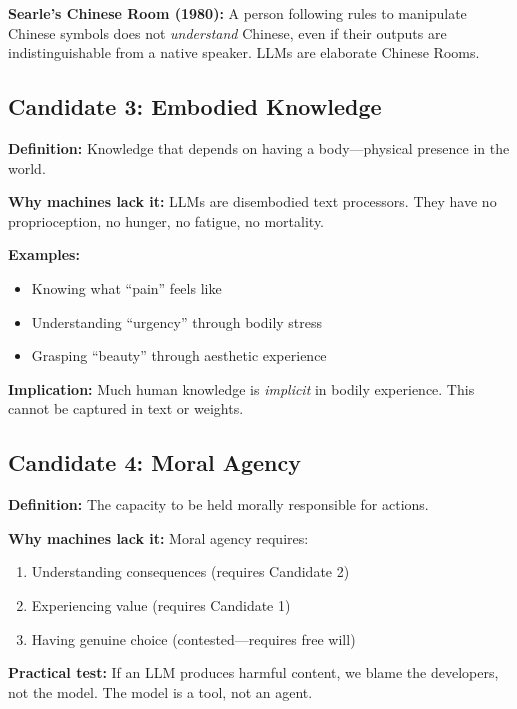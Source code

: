 \begin{tcolorbox}[colback=yellow!5!white, colframe=yellow!75!black]
\textbf{Searle's Chinese Room (1980):} A person following rules to manipulate Chinese symbols does not \textit{understand} Chinese, even if their outputs are indistinguishable from a native speaker. LLMs are elaborate Chinese Rooms.
\end{tcolorbox}


\subsection{Candidate 3: Embodied Knowledge}

\textbf{Definition:} Knowledge that depends on having a body---physical presence in the world.

\textbf{Why machines lack it:} LLMs are disembodied text processors. They have no proprioception, no hunger, no fatigue, no mortality.

\textbf{Examples:}
\begin{itemize}[nosep]
    \item Knowing what ``pain'' feels like
    \item Understanding ``urgency'' through bodily stress
    \item Grasping ``beauty'' through aesthetic experience
\end{itemize}

\textbf{Implication:} Much human knowledge is \textit{implicit} in bodily experience. This cannot be captured in text or weights.


\subsection{Candidate 4: Moral Agency}

\textbf{Definition:} The capacity to be held morally responsible for actions.

\textbf{Why machines lack it:} Moral agency requires:
\begin{enumerate}
    \item Understanding consequences (requires Candidate 2)
    \item Experiencing value (requires Candidate 1)
    \item Having genuine choice (contested---requires free will)
\end{enumerate}

\textbf{Practical test:} If an LLM produces harmful content, we blame the developers, not the model. The model is a tool, not an agent.


